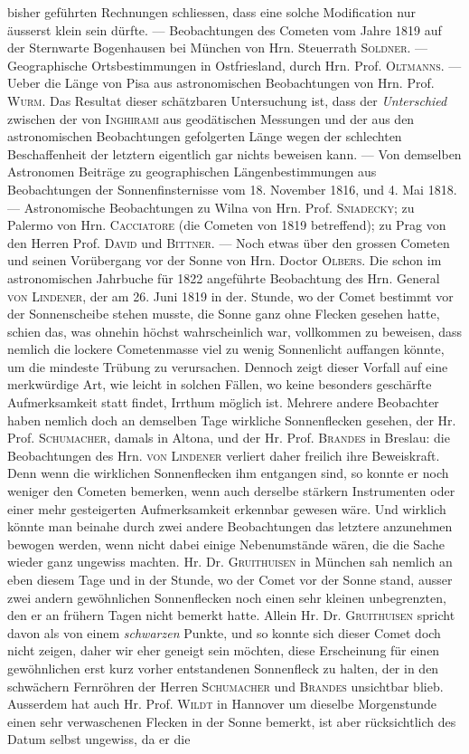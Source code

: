 bisher geführten Rechnungen schliessen, dass eine solche Modification nur äusserst klein sein dürfte. --- Beobachtungen des Cometen vom Jahre 1819 auf der Sternwarte Bogenhausen bei München von Hrn. Steuerrath \textsc{Soldner}. --- Geographische Ortsbestimmungen in Ostfriesland, durch Hrn. Prof. \textsc{Oltmanns}. --- Ueber die Länge von Pisa aus astronomischen Beobachtungen von Hrn. Prof. \textsc{Wurm}. Das Resultat dieser schätzbaren Untersuchung ist, dass der \emph{Unterschied} zwischen der von \textsc{Inghirami} aus geodätischen Messungen und der aus den astronomischen Beobachtungen gefolgerten Länge wegen der schlechten Beschaffenheit der letztern eigentlich gar nichts beweisen kann. --- Von demselben Astronomen Beiträge zu geographischen Längenbestimmungen aus Beobachtungen der Sonnenfinsternisse vom 18. November 1816, und 4. Mai 1818. --- Astronomische Beobachtungen zu Wilna von Hrn. Prof. \textsc{Sniadecky}; zu Palermo von Hrn. \textsc{Cacciatore} (die Cometen von 1819 betreffend); zu Prag von den Herren Prof. \textsc{David} und \textsc{Bittner}. --- Noch etwas über den grossen Cometen und seinen Vorübergang vor der Sonne von Hrn. Doctor \textsc{Olbers}. Die schon im astronomischen Jahrbuche für 1822 angeführte Beobachtung des Hrn. General \textsc{von Lindener}, der am 26. Juni 1819 in der. Stunde, wo der Comet bestimmt vor der Sonnenscheibe stehen musste, die Sonne ganz ohne Flecken gesehen hatte, schien das, was ohnehin höchst wahrscheinlich war, vollkommen zu beweisen, dass nemlich die lockere Cometenmasse viel zu wenig Sonnenlicht auffangen könnte, um die mindeste Trübung zu verursachen. Dennoch zeigt dieser Vorfall auf eine merkwürdige Art, wie leicht in solchen Fällen, wo keine besonders geschärfte Aufmerksamkeit statt findet, Irrthum möglich ist. Mehrere andere Beobachter haben nemlich doch an demselben Tage wirkliche Sonnenflecken gesehen, der Hr. Prof. \textsc{Schumacher}, damals in Altona, und der Hr. Prof. \textsc{Brandes} in Breslau: die Beobachtungen des Hrn. \textsc{von Lindener} verliert daher freilich ihre Beweiskraft. Denn wenn die wirklichen Sonnenflecken ihm entgangen sind, so konnte er noch weniger den Cometen bemerken, wenn auch derselbe stärkern Instrumenten oder einer mehr gesteigerten Aufmerksamkeit erkennbar gewesen wäre. Und wirklich könnte man beinahe durch zwei andere Beobachtungen das letztere anzunehmen bewogen werden, wenn nicht dabei einige Nebenumstände wären, die die Sache wieder ganz ungewiss machten. Hr. Dr. \textsc{Gruithuisen} in München sah nemlich an eben diesem Tage und in der Stunde, wo der Comet vor der Sonne stand, ausser zwei andern gewöhnlichen Sonnenflecken noch einen sehr kleinen unbegrenzten, den er an  frühern Tagen nicht bemerkt hatte. Allein Hr. Dr. \textsc{Gruithuisen} spricht davon als von einem \emph{schwarzen} Punkte, und so konnte sich dieser Comet doch nicht zeigen, daher wir eher geneigt sein möchten, diese Erscheinung für einen gewöhnlichen erst kurz vorher entstandenen Sonnenfleck zu halten, der in den schwächern Fernröhren der Herren \textsc{Schumacher} und \textsc{Brandes} unsichtbar blieb. Ausserdem hat auch Hr. Prof. \textsc{Wildt} in Hannover um dieselbe Morgenstunde einen sehr verwaschenen Flecken in der Sonne bemerkt, ist aber rücksichtlich des Datum selbst ungewiss, da er die 